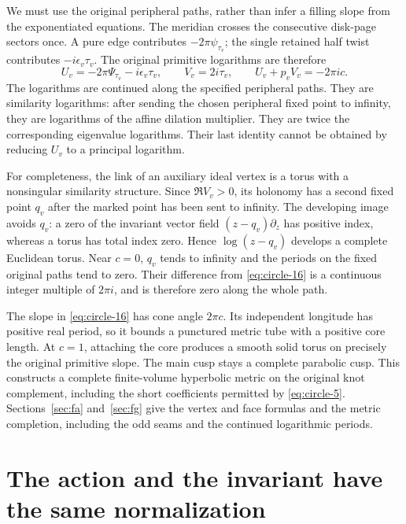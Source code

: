 We must use the original peripheral paths, rather than infer a filling
slope from the exponentiated equations. The meridian crosses
the consecutive disk-page sectors once. A
pure edge contributes \(-2\pi\psi_{\tau_v}\); the single retained half
twist contributes \(-i\epsilon_v\tau_v\). The original primitive
logarithms are therefore \begin{equation}
 U_v=-2\pi\Psi_{\tau_v}-i\epsilon_v\tau_v,\qquad
 V_v=2i\tau_v,
 \qquad U_v+p_vV_v=-2\pi ic.
 \label{eq:circle-16}
\end{equation} The logarithms are continued along the specified peripheral paths.
They are similarity logarithms: after sending the chosen peripheral
fixed point to infinity, they are logarithms of the affine dilation
multiplier. They are twice the corresponding eigenvalue logarithms. Their last identity
cannot be obtained by reducing \(U_v\) to a principal logarithm.

For completeness, the link of an auxiliary ideal vertex is a torus with
a nonsingular similarity structure. Since \(\Re V_v>0\), its holonomy
has a second fixed point \(q_v\) after the marked point has been sent to
infinity. The developing image avoids \(q_v\): a zero of the invariant
vector field \((z-q_v)\partial_z\) has positive index, whereas a torus
has total index zero. Hence \(\log(z-q_v)\) develops a complete
Euclidean torus. Near \(c=0\), \(q_v\) tends to infinity and the periods
on the fixed original paths tend to zero. Their difference from \eqref{eq:circle-16} is
a continuous integer multiple of \(2\pi i\), and is therefore zero along
the whole path.

The slope in \eqref{eq:circle-16} has cone angle \(2\pi c\). Its independent longitude
has positive real period, so it bounds a punctured metric tube with a
positive core length. At \(c=1\), attaching the core produces a smooth
solid torus on precisely the original primitive slope. The main cusp
stays a complete parabolic cusp. This constructs a complete
finite-volume hyperbolic metric on the original knot complement,
including the short coefficients permitted by \eqref{eq:circle-5}. Sections~\ref{sec:fa} and~\ref{sec:fg} give the vertex and face
formulas and the metric completion, including the odd seams and the
continued logarithmic periods.

\section{The action and the invariant have the same
normalization}\label{sec:circle-the-action-and-the-invariant-have-the-same-normalization}


